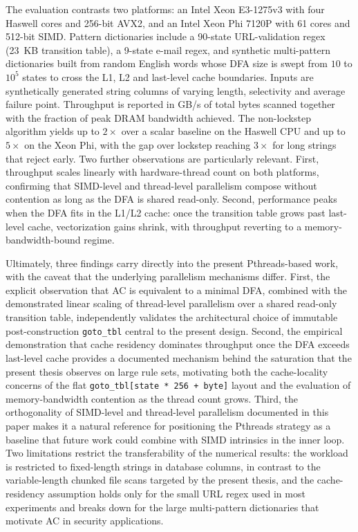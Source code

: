 The evaluation contrasts two platforms: an Intel Xeon E3-1275v3 with four Haswell cores and 256-bit AVX2, and an Intel Xeon Phi 7120P with 61 cores and 512-bit SIMD. Pattern dictionaries include a 90-state URL-validation regex (23~KB transition table), a 9-state e-mail regex, and synthetic multi-pattern dictionaries built from random English words whose DFA size is swept from $10$ to $10^{5}$ states to cross the L1, L2 and last-level cache boundaries. Inputs are synthetically generated string columns of varying length, selectivity and average failure point. Throughput is reported in GB/s of total bytes scanned together with the fraction of peak DRAM bandwidth achieved. The non-lockstep algorithm yields up to $2\times$ over a scalar baseline on the Haswell CPU and up to $5\times$ on the Xeon Phi, with the gap over lockstep reaching $3\times$ for long strings that reject early. Two further observations are particularly relevant. First, throughput scales linearly with hardware-thread count on both platforms, confirming that SIMD-level and thread-level parallelism compose without contention as long as the DFA is shared read-only. Second, performance peaks when the DFA fits in the L1/L2 cache: once the transition table grows past last-level cache, vectorization gains shrink, with throughput reverting to a memory-bandwidth-bound regime.

Ultimately, three findings carry directly into the present Pthreads-based work, with the caveat that the underlying parallelism mechanisms differ. First, the explicit observation that AC is equivalent to a minimal DFA, combined with the demonstrated linear scaling of thread-level parallelism over a shared read-only transition table, independently validates the architectural choice of immutable post-construction \texttt{goto\_tbl} central to the present design. Second, the empirical demonstration that cache residency dominates throughput once the DFA exceeds last-level cache provides a documented mechanism behind the saturation that the present thesis observes on large rule sets, motivating both the cache-locality concerns of the flat \texttt{goto\_tbl[state * 256 + byte]} layout and the evaluation of memory-bandwidth contention as the thread count grows. Third, the orthogonality of SIMD-level and thread-level parallelism documented in this paper makes it a natural reference for positioning the Pthreads strategy as a baseline that future work could combine with SIMD intrinsics in the inner loop. Two limitations restrict the transferability of the numerical results: the workload is restricted to fixed-length strings in database columns, in contrast to the variable-length chunked file scans targeted by the present thesis, and the cache-residency assumption holds only for the small URL regex used in most experiments and breaks down for the large multi-pattern dictionaries that motivate AC in security applications.

